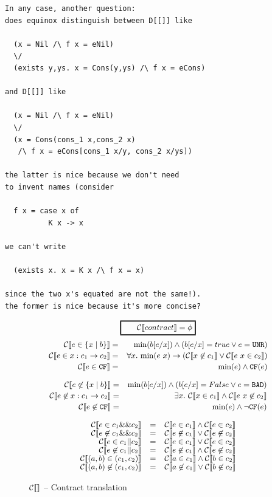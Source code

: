 \documentclass[preprint]{sigplanconf}
\begin{document}
\begin{verbatim}
In any case, another question: 
does equinox distinguish between D[[]] like

  (x = Nil /\ f x = eNil)
  \/
  (exists y,ys. x = Cons(y,ys) /\ f x = eCons)

and D[[]] like

  (x = Nil /\ f x = eNil)
  \/
  (x = Cons(cons_1 x,cons_2 x)
   /\ f x = eCons[cons_1 x/y, cons_2 x/ys])

the latter is nice because we don't need 
to invent names (consider

  f x = case x of
          K x -> x

we can't write

  (exists x. x = K x /\ f x = x)

since the two x's equated are not the same!). 
the former is nice because it's more concise?
\end{verbatim}

\begin{figure}
  $$ \ruleform{\ctrans{contract} = \phi} $$
\begin{eqnarray*}
  \ctrans{e \in \{x \mid b \}} &=&  \min{b[e/x]} \land (b[e/x] = true \lor e = \unr)\\
  \ctrans{e \in x:c_1 \to c_2} &=& \forall x.~\min{e~x} \to (\ctrans{x \not \in c_1} \lor  \ctrans{e~x \in c_2})\\
  \ctrans{e \in \cfc} &=& \min{e} \land \cf{e}
\end{eqnarray*}

\begin{eqnarray*}
  \ctrans{e \not \in \{x \mid b \}} &=&  \min{b[e/x]} \land (b[e/x] = \false \lor e = \bad)\\
  \ctrans{e \not \in x:c_1 \to c_2} &=& \exists x.~ \ctrans{x \in c_1} \land  \ctrans{e~x \not \in c_2}\\
  \ctrans{e \not \in \cfc} &=& \min{e} \land \lnot \cf{e}
\end{eqnarray*}

\begin{center}
\[  \begin{array}{rcl}
 \ctrans{e \in c_1 \&\& c_2} &=& \ctrans{e \in c_1} \land \ctrans{e \in c_2} \\
 \ctrans{e \not \in c_1 \&\& c_2} &=& \ctrans{e \not \in c_1} \lor \ctrans{e \not \in c_2}\\
 \ctrans{e \in c_1 || c_2} &=& \ctrans{e \in c_1} \lor \ctrans{e \in c_2} \\
  \ctrans{e \not \in c_1 || c_2} &=& \ctrans{e \not \in c_1} \land \ctrans{e \not \in c_2}\\
 \ctrans{(a,b) \in (c_1,c_2)}   &=& \ctrans{a \in c_1} \land \ctrans{b \in c_2} \\
 \ctrans{(a,b) \not \in (c_1,c_2)}   &=& \ctrans{a \not \in c_1} \lor \ctrans{b \not \in c_2} \\
\end{array} \]
\end{center}

\caption{$\ctrans{}$ -- Contract translation}
\label{ctrans}
\end{figure}
\end{document}
